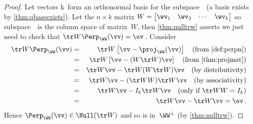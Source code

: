 \begin{proof} 
Let vectors \hlist\wv k\ form an orthonormal basis for the subspace~\WW\ (a basis exists by \autoref{thm:obaseexists}).
Let the \(n\times k\) matrix \(W=\begin{bmatrix} \wv_1&\wv_2&\cdots&\wv_k \end{bmatrix}\) so subspace~\WW\ is the column space of matrix~\(W\), then \autoref{thm:nulltrw} asserts we just need to check that \(\tr W\Perp_\WW(\vv)=\ov\)\,.
Consider 
\begin{eqnarray*}
\tr W\Perp_\WW(\vv)
&=&\tr W\left[\vv-\proj_\WW(\vv)\right]
\quad(\text{from \autoref{def:perpn}})
\\&=&\tr W\left[\vv-(W\tr W)\vv\right]
\quad(\text{from \autoref{thm:projmat}})
\\&=&\tr W\vv-\tr W(W\tr W)\vv
\quad(\text{by distributivity})
\\&=&\tr W\vv-(\tr WW)\tr W\vv 
\quad(\text{by associativity})
\\&=&\tr W\vv-I_k\tr W\vv 
\quad(\text{only if }\tr WW=I_k)
\\&=&\tr W\vv-\tr W\vv =\ov\,.
\end{eqnarray*}
Hence \(\Perp_\WW(\vv)\in\Null(\tr W)\) and so is in~\(\WW^\perp\) (by \autoref{thm:nulltrw}).


\end{proof}

